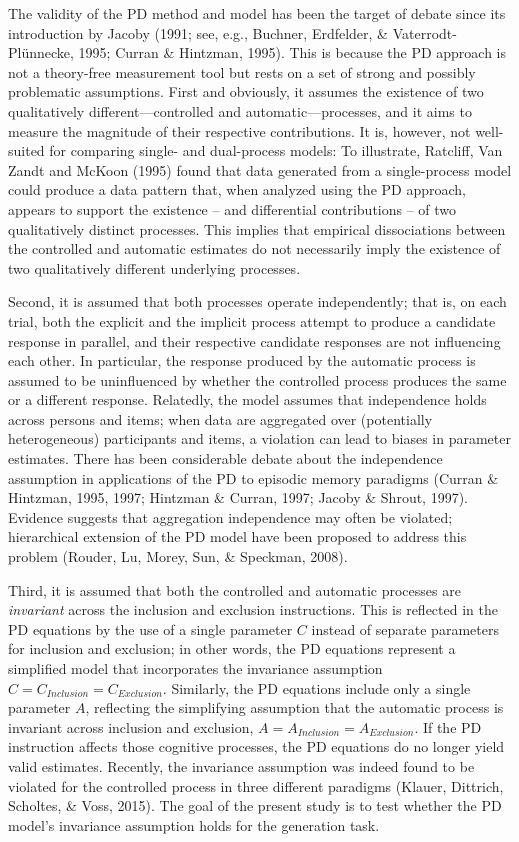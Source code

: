 \documentclass[floatsintext,man]{apa6}
\begin{document}
The validity of the PD method and model has been the target of debate
since its introduction by Jacoby (1991; see, e.g., Buchner, Erdfelder,
\& Vaterrodt-Plünnecke, 1995; Curran \& Hintzman, 1995). This is because
the PD approach is not a theory-free measurement tool but rests on a set
of strong and possibly problematic assumptions. First and obviously, it
assumes the existence of two qualitatively different---controlled and
automatic---processes, and it aims to measure the magnitude of their
respective contributions. It is, however, not well-suited for comparing
single- and dual-process models: To illustrate, Ratcliff, Van Zandt and
McKoon (1995) found that data generated from a single-process model
could produce a data pattern that, when analyzed using the PD approach,
appears to support the existence -- and differential contributions -- of
two qualitatively distinct processes. This implies that empirical
dissociations between the controlled and automatic estimates do not
necessarily imply the existence of two qualitatively different
underlying processes.

Second, it is assumed that both processes operate independently; that
is, on each trial, both the explicit and the implicit process attempt to
produce a candidate response in parallel, and their respective candidate
responses are not influencing each other. In particular, the response
produced by the automatic process is assumed to be uninfluenced by
whether the controlled process produces the same or a different
response. Relatedly, the model assumes that independence holds across
persons and items; when data are aggregated over (potentially
heterogeneous) participants and items, a violation can lead to biases in
parameter estimates. There has been considerable debate about the
independence assumption in applications of the PD to episodic memory
paradigms (Curran \& Hintzman, 1995, 1997; Hintzman \& Curran, 1997;
Jacoby \& Shrout, 1997). Evidence suggests that aggregation independence
may often be violated; hierarchical extension of the PD model have been
proposed to address this problem (Rouder, Lu, Morey, Sun, \& Speckman,
2008).

Third, it is assumed that both the controlled and automatic processes
are \emph{invariant} across the inclusion and exclusion instructions.
This is reflected in the PD equations by the use of a single parameter
\(C\) instead of separate parameters for inclusion and exclusion; in
other words, the PD equations represent a simplified model that
incorporates the invariance assumption
\(C = C_{Inclusion}=C_{Exclusion}\). Similarly, the PD equations include
only a single parameter \(A\), reflecting the simplifying assumption
that the automatic process is invariant across inclusion and exclusion,
\(A = A_{Inclusion} = A_{Exclusion}\). If the PD instruction affects
those cognitive processes, the PD equations do no longer yield valid
estimates. Recently, the invariance assumption was indeed found to be
violated for the controlled process in three different paradigms
(Klauer, Dittrich, Scholtes, \& Voss, 2015). The goal of the present
study is to test whether the PD model's invariance assumption holds for
the generation task.
\end{document}
